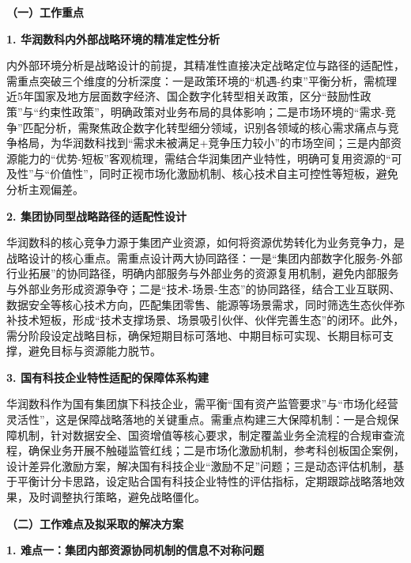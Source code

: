 \documentclass[UTF8, a4paper, 11pt]{ctexart}
\begin{document}
\begin{UnifiedBox}
\setlength{\parindent}{2em}

\noindent \textbf{（一）工作重点}

\vspace{0.2cm}
\noindent \textbf{1. 华润数科内外部战略环境的精准定性分析}

内外部环境分析是战略设计的前提，其精准性直接决定战略定位与路径的适配性，需重点突破三个维度的分析深度：一是政策环境的``机遇-约束''平衡分析，需梳理近5年国家及地方层面数字经济、国企数字化转型相关政策，区分``鼓励性政策''与``约束性政策''，明确政策对业务布局的具体影响；二是市场环境的``需求-竞争''匹配分析，需聚焦政企数字化转型细分领域，识别各领域的核心需求痛点与竞争格局，为华润数科找到``需求未被满足+竞争压力较小''的市场空间；三是内部资源能力的``优势-短板''客观梳理，需结合华润集团产业特性，明确可复用资源的``可及性''与``价值性''，同时正视市场化激励机制、核心技术自主可控性等短板，避免分析主观偏差。

\vspace{0.3cm}
\noindent \textbf{2. 集团协同型战略路径的适配性设计}

华润数科的核心竞争力源于集团产业资源，如何将资源优势转化为业务竞争力，是战略设计的核心重点。需重点设计两大协同路径：一是``集团内部数字化服务-外部行业拓展''的协同路径，明确内部服务与外部业务的资源复用机制，避免内部服务与外部业务形成资源争夺；二是``技术-场景-生态''的协同路径，结合工业互联网、数据安全等核心技术方向，匹配集团零售、能源等场景需求，同时筛选生态伙伴弥补技术短板，形成``技术支撑场景、场景吸引伙伴、伙伴完善生态''的闭环。此外，需分阶段设定战略目标，确保短期目标可落地、中期目标可实现、长期目标可支撑，避免目标与资源能力脱节。

\vspace{0.3cm}
\noindent \textbf{3. 国有科技企业特性适配的保障体系构建}

华润数科作为国有集团旗下科技企业，需平衡``国有资产监管要求''与``市场化经营灵活性''，这是保障战略落地的关键重点。需重点构建三大保障机制：一是合规保障机制，针对数据安全、国资增值等核心要求，制定覆盖业务全流程的合规审查流程，确保业务开展不触碰监管红线；二是市场化激励机制，参考科创板国企案例，设计差异化激励方案，解决国有科技企业``激励不足''问题；三是动态评估机制，基于平衡计分卡思路，设定贴合国有科技企业特性的评估指标，定期跟踪战略落地效果，及时调整执行策略，避免战略僵化。

\vspace{0.5cm}
\noindent \textbf{（二）工作难点及拟采取的解决方案}

\vspace{0.2cm}
\noindent \textbf{1. 难点一：集团内部资源协同机制的信息不对称问题}


\end{UnifiedBox}
\end{document}
